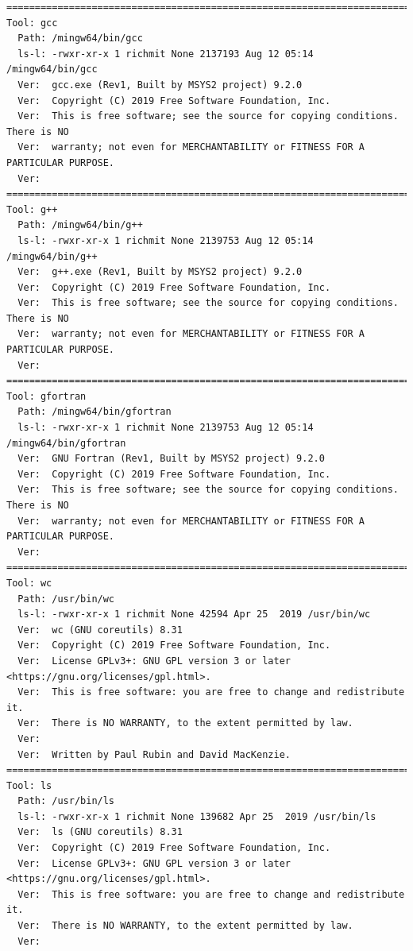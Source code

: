 \documentclass[11pt]{article}
\begin{document}
\begin{verbatim}
==========================================================================================
Tool: gcc
  Path: /mingw64/bin/gcc
  ls-l: -rwxr-xr-x 1 richmit None 2137193 Aug 12 05:14 /mingw64/bin/gcc
  Ver:  gcc.exe (Rev1, Built by MSYS2 project) 9.2.0
  Ver:  Copyright (C) 2019 Free Software Foundation, Inc.
  Ver:  This is free software; see the source for copying conditions.  There is NO
  Ver:  warranty; not even for MERCHANTABILITY or FITNESS FOR A PARTICULAR PURPOSE.
  Ver:  
==========================================================================================
Tool: g++
  Path: /mingw64/bin/g++
  ls-l: -rwxr-xr-x 1 richmit None 2139753 Aug 12 05:14 /mingw64/bin/g++
  Ver:  g++.exe (Rev1, Built by MSYS2 project) 9.2.0
  Ver:  Copyright (C) 2019 Free Software Foundation, Inc.
  Ver:  This is free software; see the source for copying conditions.  There is NO
  Ver:  warranty; not even for MERCHANTABILITY or FITNESS FOR A PARTICULAR PURPOSE.
  Ver:  
==========================================================================================
Tool: gfortran
  Path: /mingw64/bin/gfortran
  ls-l: -rwxr-xr-x 1 richmit None 2139753 Aug 12 05:14 /mingw64/bin/gfortran
  Ver:  GNU Fortran (Rev1, Built by MSYS2 project) 9.2.0
  Ver:  Copyright (C) 2019 Free Software Foundation, Inc.
  Ver:  This is free software; see the source for copying conditions.  There is NO
  Ver:  warranty; not even for MERCHANTABILITY or FITNESS FOR A PARTICULAR PURPOSE.
  Ver:  
==========================================================================================
Tool: wc
  Path: /usr/bin/wc
  ls-l: -rwxr-xr-x 1 richmit None 42594 Apr 25  2019 /usr/bin/wc
  Ver:  wc (GNU coreutils) 8.31
  Ver:  Copyright (C) 2019 Free Software Foundation, Inc.
  Ver:  License GPLv3+: GNU GPL version 3 or later <https://gnu.org/licenses/gpl.html>.
  Ver:  This is free software: you are free to change and redistribute it.
  Ver:  There is NO WARRANTY, to the extent permitted by law.
  Ver:  
  Ver:  Written by Paul Rubin and David MacKenzie.
==========================================================================================
Tool: ls
  Path: /usr/bin/ls
  ls-l: -rwxr-xr-x 1 richmit None 139682 Apr 25  2019 /usr/bin/ls
  Ver:  ls (GNU coreutils) 8.31
  Ver:  Copyright (C) 2019 Free Software Foundation, Inc.
  Ver:  License GPLv3+: GNU GPL version 3 or later <https://gnu.org/licenses/gpl.html>.
  Ver:  This is free software: you are free to change and redistribute it.
  Ver:  There is NO WARRANTY, to the extent permitted by law.
  Ver:  

\end{verbatim}
\end{document}
